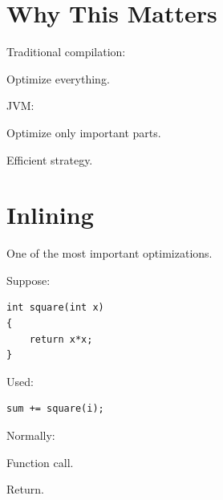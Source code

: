 \documentclass[11pt,a4paper]{book}
\begin{document}
\section{Why This Matters}

Traditional compilation:


Optimize everything.


JVM:


Optimize only important parts.


Efficient strategy.


\section{Inlining}

One of the most important
optimizations.


Suppose:

\begin{verbatim} 
int square(int x)
{
    return x*x;
}
\end{verbatim}

Used:

\begin{verbatim} 
sum += square(i);
\end{verbatim}


Normally:


Function call.


Return.

\end{document}
